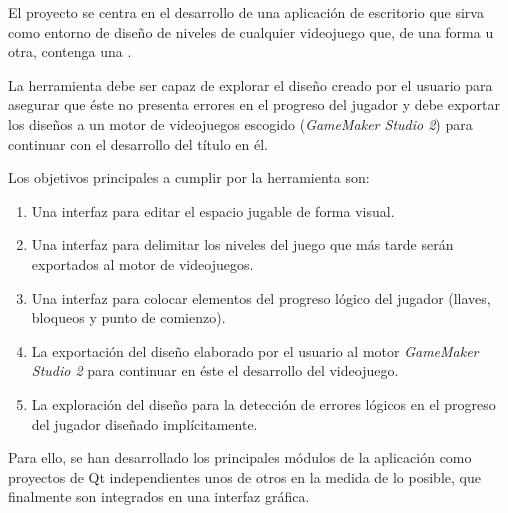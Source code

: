 El proyecto se centra en el desarrollo de una aplicación de escritorio que sirva como entorno de diseño de niveles de cualquier videojuego que, de una forma u otra, contenga una .

La herramienta debe ser capaz de explorar el diseño creado por el usuario para asegurar que éste no presenta errores en el progreso del jugador y debe exportar los diseños a un motor de videojuegos escogido (\textit{GameMaker Studio 2}) para continuar con el desarrollo del título en él.

Los objetivos principales a cumplir por la herramienta son:
\begin{enumerate}
	\item Una interfaz para editar el espacio jugable de forma visual.
	\item Una interfaz para delimitar los niveles del juego que más tarde serán exportados al motor de videojuegos.
	\item Una interfaz para colocar elementos del progreso lógico del jugador (llaves, bloqueos y punto de comienzo).
	\item La exportación del diseño elaborado por el usuario al motor \textit{GameMaker Studio 2} para continuar en éste el desarrollo del videojuego.
	\item La exploración del diseño para la detección de errores lógicos en el progreso del jugador diseñado implícitamente.
\end{enumerate}

Para ello, se han desarrollado los principales módulos de la aplicación como proyectos de Qt\cite{qt1}\cite{qt2} independientes unos de otros en la medida de lo posible, que finalmente son integrados en una interfaz gráfica.